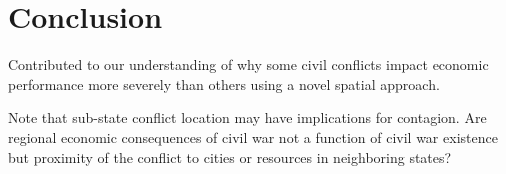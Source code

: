 \section{Conclusion}
\label{conclusion}

Contributed to our understanding of why some civil conflicts impact economic performance more severely than others using a novel spatial approach. 

Note that sub-state conflict location may have implications for contagion.  Are regional economic consequences of civil war not a function of civil war existence but proximity of the conflict to cities or resources in neighboring states?